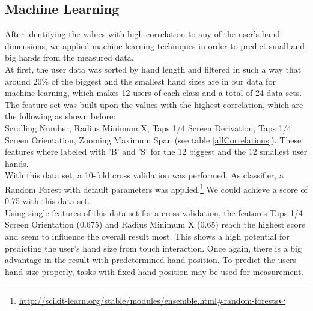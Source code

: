 \documentclass{sigchi}
\begin{document}
\subsection{Machine Learning}
After identifying the values with high correlation to any of the user's hand dimensions, we applied machine learning techniques in order to predict small and big hands from the measured data.\\
At first, the user data was sorted by hand length and filtered in such a way that around 20\% of the biggest and the smallest hand sizes are in our data for machine learning, which makes 12 users of each class and a total of 24 data sets.\\
The feature set was built upon the values with the highest correlation, which are the following as shown before:\\ Scrolling Number, Radius Minimum X, Taps 1/4 Screen Derivation, Taps 1/4 Screen Orientation, Zooming Maximum Span (see table \ref{allCorrelations}). These features where labeled with 'B' and 'S' for the 12 biggest and the 12 smallest user hands.\\
With this data set, a 10-fold cross validation was performed. As classifier, a Random Forest with default parameters was applied.\footnote{\url{http://scikit-learn.org/stable/modules/ensemble.html\#random-forests}} We could achieve a score of 0.75 with this data set.\\
Using single features of this data set for a cross validation, the features Taps 1/4 Screen Orientation (0.675) and Radius Minimum X (0.65) reach the highest score and seem to influence the overall result most. This shows a high potential for predicting the user's hand size from touch interaction. Once again, there is a big advantage in the result with predetermined hand position. To predict the users hand size properly, tasks with fixed hand position may be used for measurement.
\end{document}
